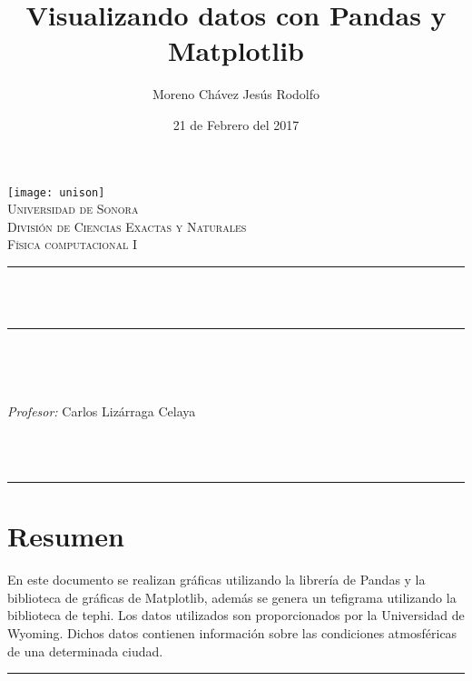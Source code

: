 \documentclass[12pt]{article}
\title{Visualizando datos con Pandas y Matplotlib}		%
\author{\centering Moreno Chávez Jesús Rodolfo}											%
\date{21 de Febrero del 2017} %
\makeatletter
\let\thetitle\@title
\let\theauthor\@author
\let\thedate\@date
\makeatother
\begin{document}

\begin{titlepage}
	\centering
    \vspace*{0.5 cm}
    \texttt{[image: unison]}\\[0.5 cm]	%
    \textsc{\Large Universidad de Sonora}\\[1.0 cm]	%
	\textsc{\Large División de Ciencias Exactas y Naturales}\\[0.5 cm]				%
	\textsc{\large Física computacional I}\\[0.5 cm]				%
	\rule{\linewidth}{0.2 mm} \\[0.4 cm]
	{ \huge \bfseries \thetitle}\\
	\rule{\linewidth}{0.2 mm} \\[0.5 cm]
	
	\begin{minipage}{\textwidth}
		\begin{flushleft} 
			\emph{\Large} \large \\
			\theauthor
			\end{flushleft}
	
		\begin{flushleft} 
			\emph{\Large Profesor:} \large \centering Carlos Lizárraga Celaya 	
			\end{flushleft}
	\end{minipage}\\[1 cm]
	{\large \thedate}\\[2 cm]
 
	\vfill
	
\end{titlepage}

\hrule 
\section*{Resumen}
En este documento se realizan gráficas utilizando la librería de Pandas y la biblioteca de gráficas de Matplotlib, además se genera un tefigrama utilizando la biblioteca de tephi. Los datos utilizados son proporcionados por la Universidad de Wyoming. Dichos datos contienen información sobre  las condiciones atmosféricas de una determinada ciudad.
\vspace{0.5 cm}
\hrule
\vspace{0.9 cm}
\end{document}
